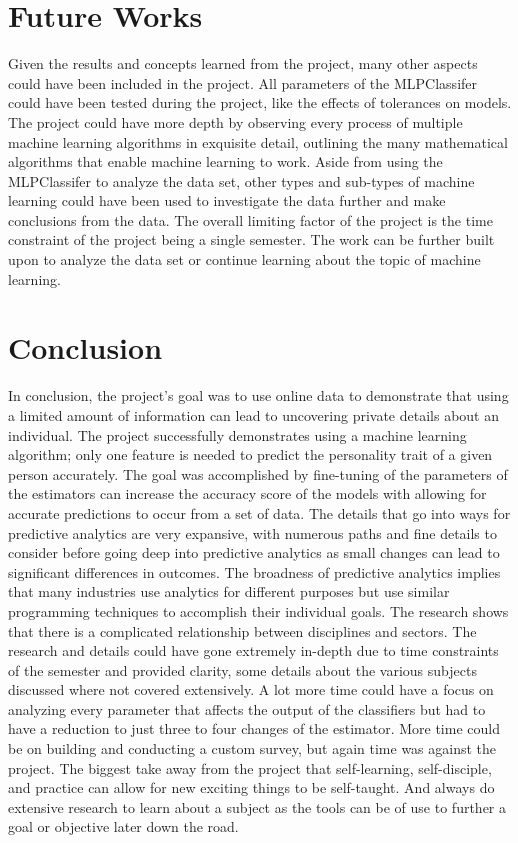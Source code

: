 \documentclass[a4paper, 12pt]{article}
\begin{document}
\section{Future Works}
\begin{paragraph}
\indent Given the results and concepts learned from the project, many other aspects could have been included in the project. All parameters of the MLPClassifer could have been tested during the project, like the effects of tolerances on models. The project could have more depth by observing every process of multiple machine learning algorithms in exquisite detail, outlining the many mathematical algorithms that enable machine learning to work. Aside from using the MLPClassifer to analyze the data set, other types and sub-types of machine learning could have been used to investigate the data further and make conclusions from the data. The overall limiting factor of the project is the time constraint of the project being a single semester. The work can be further built upon to analyze the data set or continue learning about the topic of machine learning.
\end{paragraph}

\section{Conclusion}
\begin{paragraph}
\indent In conclusion, the project's goal was to use online data to demonstrate that using a limited amount of information can lead to uncovering private details about an individual. The project successfully demonstrates using a machine learning algorithm; only one feature is needed to predict the personality trait of a given person accurately. The goal was accomplished by fine-tuning of the parameters of the estimators can increase the accuracy score of the models with allowing for accurate predictions to occur from a set of data. The details that go into ways for predictive analytics are very expansive, with numerous paths and fine details to consider before going deep into predictive analytics as small changes can lead to significant differences in outcomes. The broadness of predictive analytics implies that many industries use analytics for different purposes but use similar programming techniques to accomplish their individual goals. The research shows that there is a complicated relationship between disciplines and sectors. The research and details could have gone extremely in-depth due to time constraints of the semester and provided clarity, some details about the various subjects discussed where not covered extensively. A lot more time could have a focus on analyzing every parameter that affects the output of the classifiers but had to have a reduction to just three to four changes of the estimator. More time could be on building and conducting a custom survey, but again time was against the project. The biggest take away from the project that self-learning, self-disciple, and practice can allow for new exciting things to be self-taught. And always do extensive research to learn about a subject as the tools can be of use to further a goal or objective later down the road.
\end{paragraph}
\end{document}
